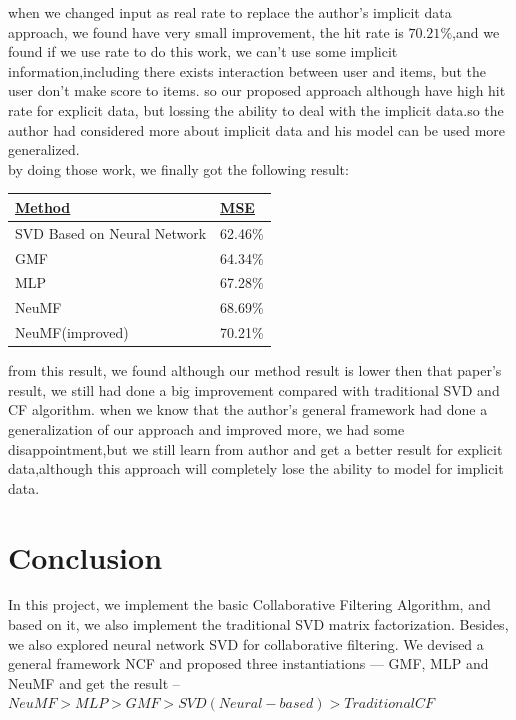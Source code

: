 \documentclass{acmtog} %
\begin{document}
when we changed input as real rate to replace the author's implicit data approach, we found have very small improvement, the hit rate is $70.21\%$,and we found if we use rate to do this work, we can't use some implicit information,including there exists interaction between user and items, but the user don't make score to items. so our proposed approach although have high hit rate for explicit  data, but lossing the ability to deal with the implicit data.so the author had considered more about implicit data and his model can be used more generalized.\\
by doing those work, we finally got the following result:
\begin{table}[h!]
	\centering
	\begin{tabular}{|l|l|}
		\hline
		{\ul \textbf{Method}} & {\ul \textbf{MSE}} \\ \hline
		SVD Based on Neural Network&62.46\%               \\ \hline
		GMF&64.34\%                \\ \hline
		MLP&67.28\%                 \\ \hline
		NeuMF&68.69\%                 \\ \hline
		NeuMF(improved)&70.21\%                 \\ \hline
	\end{tabular}
\end{table}

from this result, we found although our method result is lower then that paper's result, we still had done a big improvement compared with traditional SVD and CF algorithm. when we know that the author's general framework had  done a generalization of our approach and improved more, we had some disappointment,but we still learn from author and get a better result for explicit data,although this approach will completely lose the ability to model for implicit data. 


\section{Conclusion}
In this project, we implement the basic Collaborative Filtering Algorithm, and based on it, we also implement the traditional SVD matrix factorization. Besides, we also explored neural network SVD for collaborative filtering. We devised a general framework NCF and proposed three instantiations — GMF, MLP and NeuMF and get the result -- $NeuMF > MLP > GMF > SVD(Neural-based)>Traditional CF$


\appendix




\end{document}
